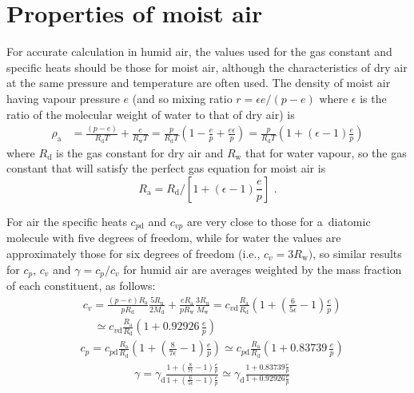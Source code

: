 \documentclass[amtd, online, hvmath]{copernicus}
\begin{document}
\appendix

\section{Properties of moist air}

For accurate calculation in humid air, the values used for the gas
constant and specific heats should be those for moist air, although
the characteristics of dry air at the same pressure and temperature
are often used. The density of moist air having vapour pressure $e$
(and so mixing ratio $r=\epsilon e/(p-e)$ where $\epsilon$ is the
ratio of the molecular weight of water to that of dry air) is
\begin{align}
\rho_{\mathrm{a}} & =
\frac{(p-e)}{R_{\mathrm{d}}T}+\frac{e}{R_{\mathrm{w}}T}=\frac{p}{R_{\mathrm{d}}T}\left(1-\frac{e}{p}+\frac{e\epsilon}{p}\right) = \frac{p}{R_{\mathrm{d}}T}\left(1+(\epsilon-1)\frac{e}{p}\right)\label{eq:MoistAirDensity-1}
\end{align}
where $R_{\mathrm{d}}$ is the gas constant for dry air and
$R_{\mathrm{w}}$ that for water vapour, so the gas constant that will
satisfy the perfect gas equation for moist air is
\begin{equation}
R_{\mathrm{a}}=R_{\mathrm{d}}/\left[1+(\epsilon-1)\frac{e}{p}\right]\,\,.\label{eq:moistR-1}
\end{equation}

For air the specific heats $c_{p\mathrm{d}}$ and
$c_{vp}$ are very close to
those for a~diatomic molecule with five degrees of freedom, while for
water the values are approximately those for six degrees of freedom
(i.e., $c_v=3R_{\mathrm{w}})$, so similar results for $c_p$, $c_v$ and
$\gamma=c_p/c_v$ for humid air are averages weighted by the
mass fraction of each constituent, as follows:
\begin{align}
&c_v  =  \frac{(p-e)R_{\mathrm{a}}}{pR_{\mathrm{d}}}\frac{5R_{\mathrm{u}}}{2M_{\mathrm{d}}}+\frac{eR_{\mathrm{a}}}{pR_{\mathrm{w}}}\frac{3R_{\mathrm{u}}}{M_{\mathrm{w}}}
  = c_{v\mathrm{d}}\frac{R_{\mathrm{a}}}{R_{\mathrm{d}}}\left(1+\left(\frac{6}{5\epsilon}-1\right)\frac{e}{p}\right)\nonumber\\
&\quad \simeq c_{v\mathrm{d}}\frac{R_{\mathrm{a}}}{R_{\mathrm{d}}}\left(1+0.92926\,\frac{e}{p}\right)\label{eq:moistcv-1}
\end{align}
\begin{align}
&c_p  =
c_{p\mathrm{d}}\frac{R_{\mathrm{a}}}{R_{\mathrm{d}}}\left(1+\left(\frac{8}{7\epsilon}-1\right)\frac{e}{p}\right)
\simeq
c_{p\mathrm{d}}\frac{R_{\mathrm{a}}}{R_{\mathrm{d}}}\left(1+0.83739\,\frac{e}{p}\right)\label{eq:moistcp-1}
\end{align}
\begin{align}
&\gamma=\gamma_{\mathrm{d}}\frac{1+\left(\frac{8}{7\epsilon}-1\right)\frac{e}{p}}{1+\left(\frac{6}{5\epsilon}-1\right)\frac{e}{p}}\simeq\gamma_{\mathrm{d}}\frac{1+0.83739\frac{e}{p}}{1+0.92926\frac{e}{p}}\label{eq:moistgamma-1}
\end{align}
\end{document}
